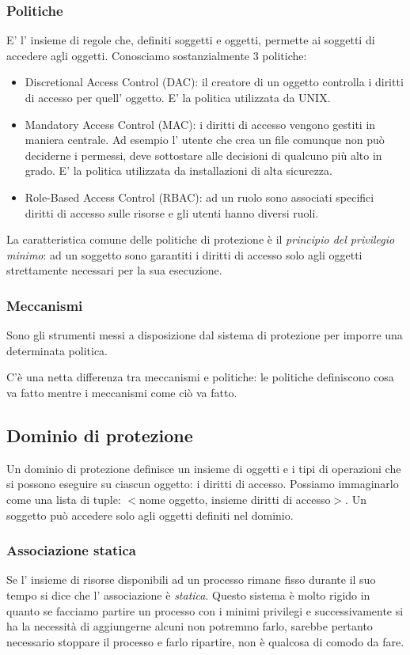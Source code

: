 \subsubsection{Politiche}
E' l' insieme di regole che, definiti soggetti e oggetti, permette ai soggetti di accedere agli oggetti.
Conosciamo sostanzialmente 3 politiche:
\begin{itemize}
    \item Discretional Access Control (DAC): il creatore di un oggetto controlla i diritti di accesso per quell' oggetto.
    E' la politica utilizzata da UNIX.

    \item Mandatory Access Control (MAC): i diritti di accesso vengono gestiti in maniera centrale.
    Ad esempio l' utente che crea un file comunque non può deciderne i permessi, deve sottostare alle decisioni di qualcuno più alto in grado.
    E' la politica utilizzata da installazioni di alta sicurezza.
    
    \item Role-Based Access Control (RBAC): ad un ruolo sono associati specifici diritti di accesso sulle risorse e gli utenti hanno diversi ruoli.
\end{itemize}
La caratteristica comune delle politiche di protezione è il \emph{principio del privilegio minimo}: ad un soggetto sono garantiti i diritti di accesso solo agli oggetti strettamente necessari per la sua esecuzione.


\subsubsection{Meccanismi}
Sono gli strumenti messi a disposizione dal sistema di protezione per imporre una determinata politica.

C'è una netta differenza tra meccanismi e politiche: le politiche definiscono cosa va fatto mentre i meccanismi come ciò va fatto.

\subsection{Dominio di protezione}
Un dominio di protezione definisce un insieme di oggetti e i tipi di operazioni che si possono eseguire su ciascun oggetto: i diritti di accesso.
Possiamo immaginarlo come una lista di tuple: $<$nome oggetto, insieme diritti di accesso$>$.
Un soggetto può accedere solo agli oggetti definiti nel dominio.

\subsubsection{Associazione statica}
Se l' insieme di risorse disponibili ad un processo rimane fisso durante il suo tempo si dice che l' associazione è \emph{statica}.
Questo sistema è molto rigido in quanto se facciamo partire un processo con i minimi privilegi e successivamente si ha la necessità di aggiungerne alcuni non potremmo farlo, sarebbe pertanto necessario stoppare il processo e farlo ripartire, non è qualcosa di comodo da fare.

